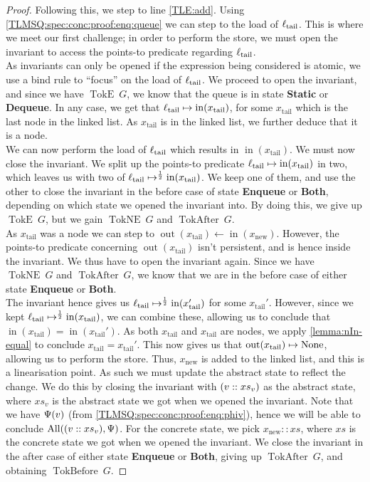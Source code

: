 \documentclass[a4paper, 10pt]{report}
\theoremstyle{definition}
\newcommand{\xsc}{xs}
\newcommand{\AllP}{\operatorname{All}}
\newcommand{\locN}[1]{\loc_{\mathrm{#1}}}
\newcommand{\loctail}{\locN{tail}}
\newcommand{\nIn}[1]{\operatorname{in}(#1)}
\newcommand{\nOut}[1]{\operatorname{out}(#1)}
\newcommand{\node}{x}
\newcommand{\nodeN}[1]{\node_{\mathrm{#1}}}
\newcommand{\nodetail}{\nodeN{tail}}
\newcommand{\nodenew}{\nodeN{new}}
\newcommand{\absvalue}{\val}
\newcommand{\absvalueList}{xs_v}
\newcommand{\StaticState}{\textbf{Static}\xspace}
\newcommand{\EnqueueState}{\textbf{Enqueue}\xspace}
\newcommand{\DequeueState}{\textbf{Dequeue}\xspace}
\newcommand{\BothState}{\textbf{Both}\xspace}
\newcommand{\Qg}{G}
\newcommand{\TokE}[1]{\operatorname{TokE} ~ #1}
\newcommand{\TokEQg}{\TokE{\Qg}}
\newcommand{\TokNE}[1]{\operatorname{TokNE} ~ #1}
\newcommand{\TokNEQg}{\TokNE{\Qg}}
\newcommand{\TokBefore}[1]{\operatorname{TokBefore} ~ #1}
\newcommand{\TokBeforeQg}{\TokBefore{\Qg}}
\newcommand{\TokAfter}[1]{\operatorname{TokAfter} ~ #1}
\newcommand{\TokAfterQg}{\TokAfter{\Qg}}
\begin{document}
\begin{proof}
Following this, we step to line \ref{TLE:add}. Using \ref{TLMSQ:spec:conc:proof:enq:queue} we can step to the load of $\loctail$. This is where we meet our first challenge; in order to perform the store, we must open the invariant to access the points-to predicate regarding $\loctail$.\\
As invariants can only be opened if the expression being considered is atomic, we use a bind rule to ``focus'' on the load of $\loctail$. We proceed to open the invariant, and since we have $\TokEQg$, we know that the queue is in state \StaticState or \DequeueState. In any case, we get that $\loctail \mapsto \nIn{\nodetail}$, for some $\nodetail$ which is the last node in the linked list. As $\nodetail$ is in the linked list, we further deduce that it is a node.\\
We can now perform the load of $\loctail$ which results in $\nIn{\nodetail}$. We must now close the invariant. We split up the points-to predicate $\loctail \mapsto \nIn{\nodetail}$ in two, which leaves us with two of $\loctail \mapsto^{\frac{1}{2}} \nIn{\nodetail}$. We keep one of them, and use the other to close the invariant in the before case of state \EnqueueState or \BothState, depending on which state we opened the invariant into. By doing this, we give up $\TokEQg$, but we gain $\TokNEQg$ and $\TokAfterQg$.\\
As $\nodetail$ was a node we can step to $\nOut{\nodetail} \gets \nIn{\nodenew}$. However, the points-to predicate concerning $\nOut{\nodetail}$ isn't persistent, and is hence inside the invariant. We thus have to open the invariant again. Since we have $\TokNEQg$ and $\TokAfterQg$, we know that we are in the before case of either state \EnqueueState or \BothState.\\
The invariant hence gives us $\loctail \mapsto^{\frac{1}{2}} \nIn{\nodetail'}$ for some $\nodetail'$. However, since we kept $\loctail \mapsto^{\frac{1}{2}} \nIn{\nodetail}$, we can combine these, allowing us to conclude that $\nIn{\nodetail} = \nIn{\nodetail'}$. As both $\nodetail$ and $\nodetail$ are nodes, we apply \ref{lemma:nIn-equal} to conclude $\nodetail = \nodetail'$. This now gives us that $\nOut{\nodetail} \mapsto \None$, allowing us to perform the store. Thus, $\nodenew$ is added to the linked list, and this is a linearisation point. As such we must update the abstract state to reflect the change. We do this by closing the invariant with $(\absvalue :: \absvalueList)$ as the abstract state, where $\absvalueList$ is the abstract state we got when we opened the invariant. Note that we have $\Psi(\absvalue)$ (from \ref{TLMSQ:spec:conc:proof:enq:phiv}), hence we will be able to conclude $\AllP((\absvalue :: \absvalueList), \Psi)$. For the concrete state, we pick $\nodenew :: \xsc$, where $\xsc$ is the concrete state we got when we opened the invariant. We close the invariant in the after case of either state \EnqueueState or \BothState, giving up $\TokAfterQg$, and obtaining $\TokBeforeQg$.


\end{proof}
\end{document}
